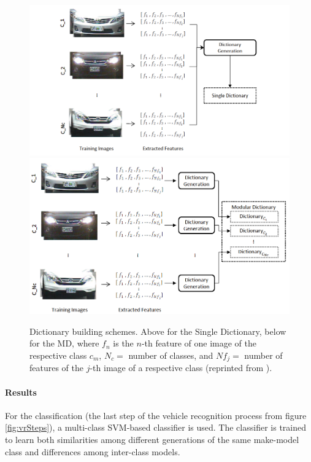 \begin{figure}[bth]
  \centering
        \includegraphics[width=.95\linewidth]{gfx/single_dictionary_reprint}
        \includegraphics[width=.95\linewidth]{gfx/modular_dictionary_reprint}
        \caption{Dictionary building schemes. Above for the Single Dictionary, below for the MD, where $f_n$ is the $n$-th feature of one image of the respective class $c_m$, $N_c = $ number of classes, and $Nf_j = $ number of features of the $j$-th image of a respective class (reprinted from \citep{siddiqui2015robust}).}
        \label{fig:dictionarySDMD}
\end{figure}

\paragraph{Results}
For the classification (the last step of the vehicle recognition process from figure \ref{fig:vrSteps}), a multi-class SVM-based classifier is used. The classifier is trained to learn both similarities among different generations of the same make-model class and differences among inter-class models.

